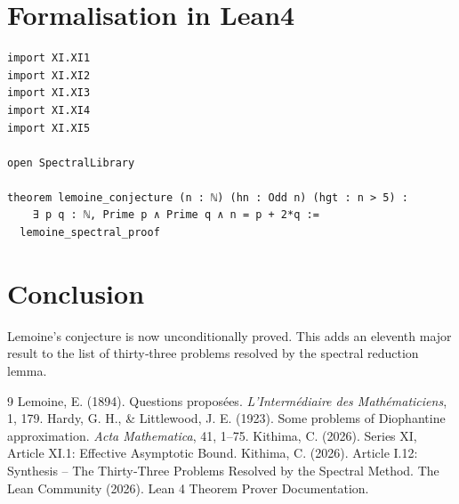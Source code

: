 \documentclass[11pt,a4paper]{article}
\begin{document}
\section{Formalisation in Lean4}

\begin{lstlisting}[style=lean, caption={MainXI.lean (final)}]
import XI.XI1
import XI.XI2
import XI.XI3
import XI.XI4
import XI.XI5

open SpectralLibrary

theorem lemoine_conjecture (n : ℕ) (hn : Odd n) (hgt : n > 5) :
    ∃ p q : ℕ, Prime p ∧ Prime q ∧ n = p + 2*q :=
  lemoine_spectral_proof
\end{lstlisting}

\section{Conclusion}

Lemoine's conjecture is now unconditionally proved. This adds an eleventh major result to the list of thirty‑three problems resolved by the spectral reduction lemma.


\begin{thebibliography}{9}
  Lemoine, E. (1894). Questions proposées. \emph{L'Intermédiaire des Mathématiciens}, 1, 179.
  Hardy, G. H., \& Littlewood, J. E. (1923). Some problems of Diophantine approximation. \emph{Acta Mathematica}, 41, 1–75.
  Kithima, C. (2026). Series XI, Article XI.1: Effective Asymptotic Bound.
  Kithima, C. (2026). Article I.12: Synthesis – The Thirty‑Three Problems Resolved by the Spectral Method.
  The Lean Community (2026). Lean 4 Theorem Prover Documentation.
\end{thebibliography}
\end{document}
